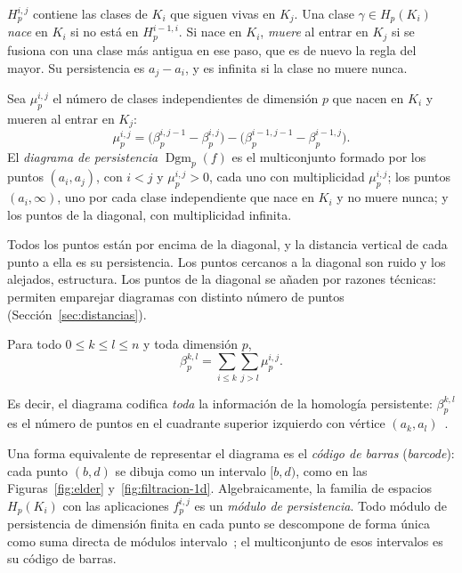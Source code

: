 $H_p^{i,j}$ contiene las clases de $K_i$ que siguen vivas en $K_j$. Una
clase $\gamma\in H_p(K_i)$ \emph{nace} en $K_i$ si no está en
$H_p^{i-1,i}$. Si nace en $K_i$, \emph{muere} al entrar en $K_j$ si se
fusiona con una clase más antigua en ese paso, que es de nuevo la regla del
mayor. Su persistencia es $a_j-a_i$, y es infinita si la clase no muere
nunca.

\begin{definicion}
Sea $\mu_p^{i,j}$ el número de clases independientes de dimensión $p$ que
nacen en $K_i$ y mueren al entrar en $K_j$:
\[
  \mu_p^{i,j}=\bigl(\beta_p^{i,j-1}-\beta_p^{i,j}\bigr)
             -\bigl(\beta_p^{i-1,j-1}-\beta_p^{i-1,j}\bigr).
\]
El \emph{diagrama de persistencia} $\operatorname{Dgm}_p(f)$ es el
multiconjunto formado por los puntos $(a_i,a_j)$, con $i<j$ y
$\mu_p^{i,j}>0$, cada uno con multiplicidad $\mu_p^{i,j}$; los puntos
$(a_i,\infty)$, uno por cada clase independiente que nace en $K_i$ y no
muere nunca; y los puntos de la diagonal, con multiplicidad infinita.
\end{definicion}

Todos los puntos están por encima de la diagonal, y la distancia vertical
de cada punto a ella es su persistencia. Los puntos cercanos a la diagonal
son ruido y los alejados, estructura. Los puntos de la diagonal se añaden
por razones técnicas: permiten emparejar diagramas con distinto número de
puntos (Sección~\ref{sec:distancias}).

\begin{teorema}
Para todo $0\le k\le l\le n$ y toda dimensión $p$,
\[
  \beta_p^{k,l}=\sum_{i\le k}\sum_{j>l}\mu_p^{i,j}.
\]
\end{teorema}

Es decir, el diagrama codifica \emph{toda} la información de la homología
persistente: $\beta_p^{k,l}$ es el número de puntos en el cuadrante
superior izquierdo con vértice $(a_k,a_l)$~\cite[§VII.1]{edelsbrunner2010}.

\begin{observacion}
Una forma equivalente de representar el diagrama es el \emph{código de
barras} (\emph{barcode}): cada punto $(b,d)$ se dibuja como un intervalo
$[b,d)$, como en las Figuras~\ref{fig:elder} y~\ref{fig:filtracion-1d}.
Algebraicamente, la familia de espacios $H_p(K_i)$ con las aplicaciones
$f_p^{i,j}$ es un \emph{módulo de persistencia}. Todo módulo de persistencia
de dimensión finita en cada punto se descompone de forma única como suma
directa de módulos intervalo~\cite{crawleyboevey2015}; el multiconjunto de
esos intervalos es su código de barras.
\end{observacion}

